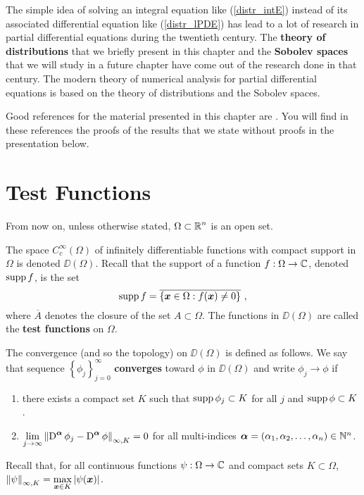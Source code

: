 The simple idea of solving an integral equation like
(\ref{distr_intE}) instead of its associated differential equation
like (\ref{distr_lPDE}) has lead to a lot of research in partial
differential equations during the twentieth century.  The
{\bfseries theory of distributions} that we
briefly present in this chapter and the
{\bfseries Sobolev spaces} that we will
study in a future chapter have come out of the research done in
that century.  The modern theory of numerical analysis for partial
differential equations is based on the theory of distributions and the
Sobolev spaces.

Good references for the material presented in this chapter are
\cite{ReeSim,RuFA}.  You will find in these references the proofs of
the results that we state without proofs in the presentation below.

\section{Test Functions} \label{SectTestFnct}

From now on, unless otherwise stated, $\displaystyle \Omega \subset \mathbb{R}^n$ is an
open set.

The space $\displaystyle C_c^\infty(\Omega)$ of infinitely
differentiable functions with compact support in $\Omega$ is denoted
$\DD(\Omega)$.
Recall that the support of a function $f:\Omega \rightarrow \mathbb{C}$, denoted
$\operatorname{supp} f$, is the set
\[
\operatorname{supp} f = \overline{\left\{ {\bm{x}} \in \Omega : f({\bm{x}}) \neq 0 \right\}} \ ,
\]
where $\overline{A}$ denotes the closure of the set $A\subset \Omega$.
The functions in $\DD(\Omega)$ are called the
{\bfseries test functions} on $\Omega$. 

The convergence (and so the topology) on $\DD(\Omega)$ is defined as
follows.  We say that sequence
$\displaystyle \left\{\phi_j\right\}_{j=0}^\infty$
{\bfseries converges}
toward $\phi$ in $\DD(\Omega)$ and write
$\displaystyle \phi_j \rightarrow \phi$ if
\begin{enumerate}
\item there exists a compact set $K$ such that
$\operatorname{supp} \phi_j \subset K$ for all $j$ and $\operatorname{supp} \phi \subset K$.
\item $\displaystyle \lim_{j\rightarrow \infty}
\left\| \operatorname{D}^{{\bm{\alpha}}} \phi_j
- \operatorname{D}^{{\bm{\alpha}}} \phi\right\|_{\infty,K} =0$
for all multi-indices
${\bm{\alpha}} = (\alpha_1,\alpha_2, \ldots, \alpha_n) \in \mathbb{N}^n$.
\end{enumerate}
Recall that, for all continuous functions $\psi:\Omega \to \mathbb{C}$ and
compact sets $K\subset \Omega$,
$\displaystyle \left\| \psi \right\|_{\infty,K} =
\max_{{\bm{x}}\in K} \left| \psi({\bm{x}}) \right|$.

